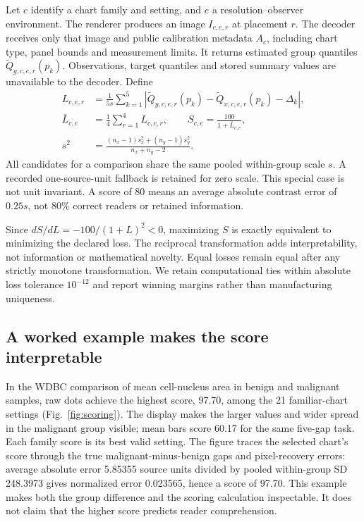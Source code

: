 \documentclass[11pt]{article}
\begin{document}
Let $c$ identify a chart family and setting, and $e$ a resolution--observer environment. The renderer produces an image $I_{c,e,r}$ at placement $r$. The decoder receives only that image and public calibration metadata $A_c$, including chart type, panel bounds and measurement limits. It returns estimated group quantiles $\widetilde Q_{g,c,e,r}(p_k)$. Observations, target quantiles and stored summary values are unavailable to the decoder. Define
\begin{align}
L_{c,e,r}&=\frac{1}{5s}\sum_{k=1}^5|\widetilde Q_{y,c,e,r}(p_k)-\widetilde Q_{x,c,e,r}(p_k)-\Delta_k|,\\
\overline L_{c,e}&=\frac14\sum_{r=1}^4L_{c,e,r},\qquad S_{c,e}=\frac{100}{1+\overline L_{c,e}},\label{eq:score}\\
s^2&=\frac{(n_x-1)s_x^2+(n_y-1)s_y^2}{n_x+n_y-2}.
\end{align}
All candidates for a comparison share the same pooled within-group scale $s$. A recorded one-source-unit fallback is retained for zero scale. This special case is not unit invariant. A score of 80 means an average absolute contrast error of $0.25s$, not 80\% correct readers or retained information.

Since $dS/dL=-100/(1+L)^2<0$, maximizing $S$ is exactly equivalent to minimizing the declared loss. The reciprocal transformation adds interpretability, not information or mathematical novelty. Equal losses remain equal after any strictly monotone transformation. We retain computational ties within absolute loss tolerance $10^{-12}$ and report winning margins rather than manufacturing uniqueness.

\subsection*{A worked example makes the score interpretable}
In the WDBC comparison of mean cell-nucleus area in benign and malignant samples, raw dots achieve the highest score, 97.70, among the 21 familiar-chart settings (Fig.~\ref{fig:scoring}). The display makes the larger values and wider spread in the malignant group visible; mean bars score 60.17 for the same five-gap task. Each family score is its best valid setting. The figure traces the selected chart's score through the true malignant-minus-benign gaps and pixel-recovery errors: average absolute error 5.85355 source units divided by pooled within-group SD 248.3973 gives normalized error 0.023565, hence a score of 97.70. This example makes both the group difference and the scoring calculation inspectable. It does not claim that the higher score predicts reader comprehension.
\end{document}
